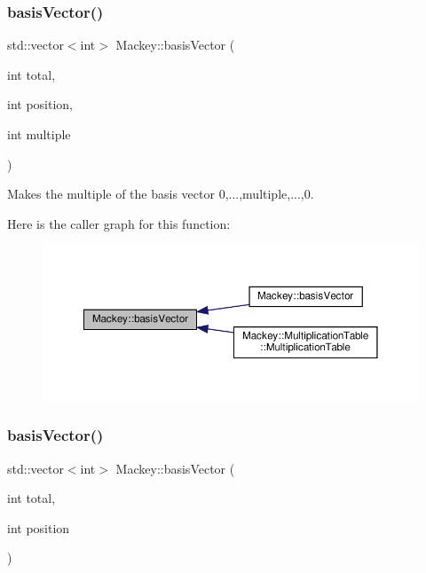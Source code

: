 \subsubsection{\texorpdfstring{basis\+Vector()}{basisVector()}\hspace{0.1cm}{\footnotesize\ttfamily [1/2]}}
{\footnotesize\ttfamily std\+::vector$<$int$>$ Mackey\+::basis\+Vector (\begin{DoxyParamCaption}\item[{int}]{total,  }\item[{int}]{position,  }\item[{int}]{multiple }\end{DoxyParamCaption})\hspace{0.3cm}{\ttfamily [inline]}}



Makes the multiple of the basis vector 0,...,multiple,...,0. 

Here is the caller graph for this function\+:\nopagebreak
\begin{figure}[H]
\begin{center}
\leavevmode
\includegraphics[width=350pt]{namespaceMackey_a86cc6cbaa708580f4e382b066bd0b7d4_icgraph}
\end{center}
\end{figure}
\mbox{\label{namespaceMackey_ae3454eb9b2574a835a29e3f58cfc6ead}} 
\subsubsection{\texorpdfstring{basis\+Vector()}{basisVector()}\hspace{0.1cm}{\footnotesize\ttfamily [2/2]}}
{\footnotesize\ttfamily std\+::vector$<$int$>$ Mackey\+::basis\+Vector (\begin{DoxyParamCaption}\item[{int}]{total,  }\item[{int}]{position }\end{DoxyParamCaption})\hspace{0.3cm}{\ttfamily [inline]}}




